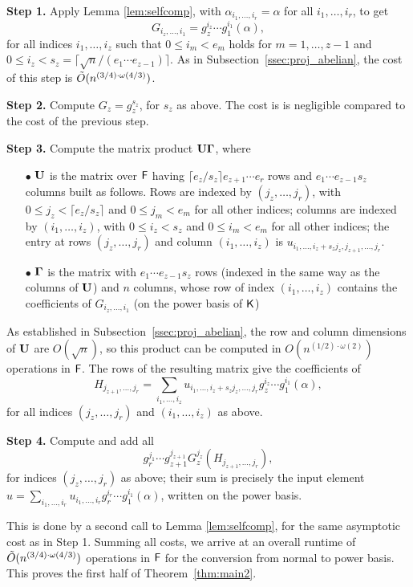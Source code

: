 \smallskip\noindent \textbf{Step 1.} Apply Lemma \ref{lem:selfcomp},
with $\alpha_{i_1,\dots,i_r} = \alpha$ for all $i_1,\dots,i_r$, to get
$$ G_{i_z,\dots,i_1}=g_z^{i_z} \cdots
g_1^{i_1}(\alpha),$$ for all indices $i_1,\dots,i_z$ such that $0\leq
i_m < e_m$ holds for $m=1,\dots,z-1$ and $0\leq i_z <s_z=
\lceil{\sqrt{n}}/(e_1 \cdots e_{z-1})\rceil$.  As in
Subsection~\ref{ssec:proj_abelian}, the cost of this step is
$\tilde{O}(n^{(3/4)\cdot \omega(4/3)})$.

\smallskip\noindent\textbf{Step 2.} Compute $G_z=g_z^{s_z}$, for $s_z$
as above. The cost is is negligible compared to the cost of the
previous step.

\smallskip\noindent\textbf{Step 3.} Compute the matrix product 
$\mat U \mat \Gamma$, where
\begin{itemize}
\item[$\bullet$] $\mat U$ is the matrix over ${\mathsf{F}}$ having $\lceil
  e_z/s_z\rceil e_{z+1} \cdots e_r$ rows and $e_1 \cdots e_{z-1} s_z$
  columns built as follows. Rows are indexed by $(j_z,\dots,j_r)$,
  with $0\le j_z < \lceil e_z/s_z\rceil$ and $0 \le j_m < e_m$ for all
  other indices; columns are indexed by $(i_1,\dots,i_z)$, with $0\le
  i_z < s_z$ and $0 \le i_m < e_m$ for all other indices; the entry at
  rows $(j_z,\dots,j_r)$ and column $(i_1,\dots,i_z)$ is
  $u_{i_1,\dots,i_z + s_z j_z, j_{z+1},\dots,j_r}$.
\item[$\bullet$] $\mat \Gamma$ is the matrix with $e_1 \cdots e_{z-1}
  s_z$ rows (indexed in the same way as the columns of $\mat U$) and $n$
  columns, whose row of index $(i_1,\dots,i_z)$ contains the
  coefficients of $ G_{i_z,\dots,i_1}$ (on the power basis of ${\mathsf{K}}$)
\end{itemize}
As established in Subsection~\ref{ssec:proj_abelian}, the row and column
dimensions of $\mat U$ are $O(\sqrt n)$, so this product can 
be computed in $O(n^{(1/2)\cdot\omega(2)})$ operations in ${\mathsf{F}}$. The rows of 
the resulting matrix give the coefficients of 
$$ H_{j_{z+1},\dots,j_r} = \sum_{i_1,\dots,i_z} u_{i_1,\dots,i_z+s_z j_z,\dots,j_r} g_z^{i_z} \cdots
g_1^{i_1}(\alpha),$$
for all indices $(j_z,\dots,j_r)$ and $(i_1,\dots,i_z)$ as above.

\smallskip\noindent\textbf{Step 4.} Compute and add all
$$g_r^{j_1} \cdots g_{z+1}^{j_{z+1}} G_z^{j_z} ( H_{j_{z+1},\dots,j_r}
),$$ for indices $(j_z,\dots,j_r)$ as above; their sum is precisely
the input element $u=\sum_{i_1,\dots,i_r} u_{i_1,\dots,i_r} g_r^{i_r}
\cdots g_1^{i_1}(\alpha)$, written on the power basis.

This is done by a second call to Lemma \ref{lem:selfcomp}, for the same
asymptotic cost as in Step 1. Summing all costs, we arrive
at an overall runtime of $\tilde{O}(n^{(3/4)\cdot \omega(4/3)})$ operations in ${\mathsf{F}}$ for
the conversion from normal to power basis. This proves the first 
half of Theorem~\ref{thm:main2}.

